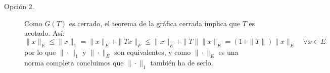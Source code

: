 \documentclass[12pt]{article}
\begin{document}
\begin{ejercicio}[3.5 Puntos]
\begin{description}
\begin{description}
                    \item [Opción 2.] Como $G(T)$ es cerrado, el teorema de la gráfica cerrada implica que $T$ es acotado. Así:
                        \begin{equation*}
                            \|x\|_E \leq \|x\|_1 = \|x\|_E + \|Tx\|_F \leq \|x\|_E + \|T\|\|x\|_E = (1+\|T\|)\|x\|_E \quad \forall x\in E
                        \end{equation*}
                        por lo que $\|\cdot \|_1$ y $\|\cdot \|_E$ son equivalentes, y como $\|\cdot \|_E$ es una norma completa concluimos que $\|\cdot \|_1$ también ha de serlo.
                \end{description}
        \end{description}
    \end{ejercicio}
\end{document}
